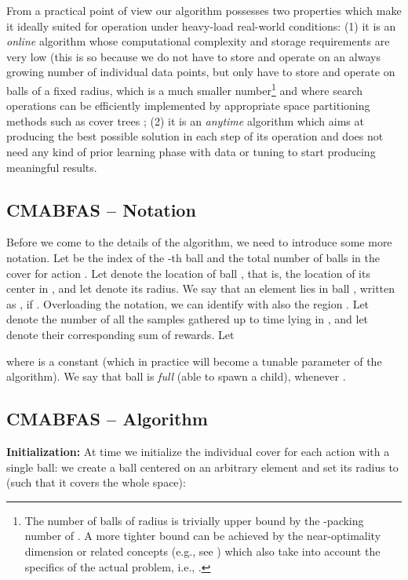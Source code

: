 \documentclass{llncs}
\begin{document}
From a practical point of view our algorithm possesses two properties which make it
ideally suited for operation under heavy-load real-world conditions: (1) it is an
{\em online} algorithm whose computational complexity and storage requirements are
very low (this is so because we do not have to store and operate on an always growing
number of individual data points, but only have to store and operate on balls of a fixed radius, 
which is a much smaller
number\footnote{The number of balls of radius  is trivially upper bound by the -packing number of
. A more tighter bound can be achieved by the near-optimality dimension or related concepts 
(e.g., see \cite{Xarmed_bubeck,DBLP:journals/corr/abs-0907-3986}) which also take into account 
the specifics of the actual problem, i.e., .} and where search operations can be efficiently implemented by appropriate
space partitioning methods such as cover trees \cite{covertree}; (2) it is an {\em anytime}
algorithm which aims at producing the best possible solution in each step of its 
operation and does not need any kind of prior learning phase with data or tuning
to start producing meaningful results.

\subsection{\bf CMABFAS -- Notation} 
\label{sec:cmab_notation}
Before we come to the details of the algorithm, we need to introduce some more
notation. 
Let  be the index of the -th ball and 
 the total number of balls in the cover for action . Let 
 denote the location of ball , that is,
the location of its center in , and let 
denote its radius. We say that an element  lies in ball
, written as , if . 
Overloading the notation, we can identify with  also the region 
.
Let  denote the number of all the samples gathered up to time 
lying in , and let  denote their corresponding
sum of rewards. Let 
 
where  is a constant (which in practice will become a tunable parameter of the algorithm).
We say that ball  is {\em full} (able to spawn a child), whenever 
. 


\subsection{CMABFAS -- Algorithm} 
\label{sec:algo_implementation}
{\bf \noindent Initialization:} At time  we initialize the individual cover for each action with a single ball: 
we create a ball centered on an arbitrary element  and set its radius to 
(such that it covers the whole space):
\end{document}
